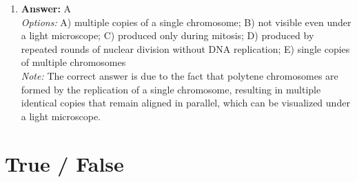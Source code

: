 \documentclass[12pt]{article}
\begin{document}
\begin{enumerate}[label=\arabic*.]
\item \textbf{Answer:} A
\\ \textit{Options:} A) multiple copies of a single chromosome; B) not visible even under a light microscope; C) produced only during mitosis; D) produced by repeated rounds of nuclear division without DNA replication; E) single copies of multiple chromosomes
\\ \textit{Note:} The correct answer is due to the fact that polytene chromosomes are formed by the replication of a single chromosome, resulting in multiple identical copies that remain aligned in parallel, which can be visualized under a light microscope.
\end{enumerate}

\section*{True / False}
\end{document}
